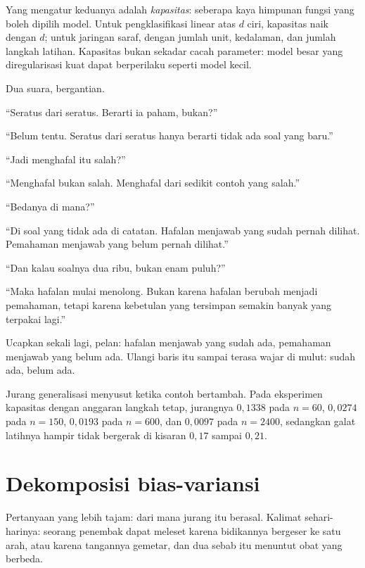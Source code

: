 Yang mengatur keduanya adalah \emph{kapasitas}: seberapa kaya himpunan fungsi yang boleh
dipilih model. Untuk pengklasifikasi linear atas $d$ ciri, kapasitas naik dengan $d$;
untuk jaringan saraf, dengan jumlah unit, kedalaman, dan jumlah langkah latihan.
Kapasitas bukan sekadar cacah parameter: model besar yang diregularisasi kuat dapat
berperilaku seperti model kecil.

\begin{bacakeras}
Dua suara, bergantian.

``Seratus dari seratus. Berarti ia paham, bukan?''

``Belum tentu. Seratus dari seratus hanya berarti tidak ada soal yang baru.''

``Jadi menghafal itu salah?''

``Menghafal bukan salah. Menghafal dari sedikit contoh yang salah.''

``Bedanya di mana?''

``Di soal yang tidak ada di catatan. Hafalan menjawab yang sudah pernah dilihat.
Pemahaman menjawab yang belum pernah dilihat.''

``Dan kalau soalnya dua ribu, bukan enam puluh?''

``Maka hafalan mulai menolong. Bukan karena hafalan berubah menjadi pemahaman, tetapi
karena kebetulan yang tersimpan semakin banyak yang terpakai lagi.''

Ucapkan sekali lagi, pelan: hafalan menjawab yang sudah ada, pemahaman menjawab yang
belum ada. Ulangi baris itu sampai terasa wajar di mulut: sudah ada, belum ada.
\end{bacakeras}

Jurang generalisasi menyusut ketika contoh bertambah. Pada eksperimen kapasitas dengan
anggaran langkah tetap, jurangnya $0{,}1338$ pada $n=60$, $0{,}0274$ pada $n=150$,
$0{,}0193$ pada $n=600$, dan $0{,}0097$ pada $n=2400$, sedangkan galat latihnya hampir
tidak bergerak di kisaran $0{,}17$ sampai $0{,}21$.

\section{Dekomposisi bias-variansi}

Pertanyaan yang lebih tajam: dari mana jurang itu berasal. Kalimat sehari-harinya:
seorang penembak dapat meleset karena bidikannya bergeser ke satu arah, atau karena
tangannya gemetar, dan dua sebab itu menuntut obat yang berbeda.


